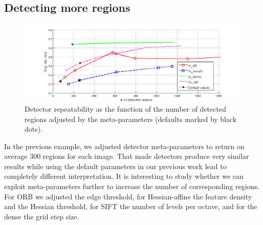 \documentclass[10pt,journal,cspaper,compsoc]{IEEEtran}
\begin{document}
\subsection{Detecting more regions\label{sec:more_regions}}
%
\begin{figure}[h]
  \begin{center}
    \includegraphics[trim=60 0 40 0, clip=true, width=0.99\linewidth]{resources/antti_results/DetectingMoreRegions/DetectorPlot.png}
    \caption{Detector repeatability as the function of the number of
      detected regions adjusted by the meta-parameters (defaults
      marked by black dots).\label{fig:more_regions}}
  \end{center}
\end{figure}
%
In the previous example, we adjusted detector meta-parameters to
return on average 300 regions for each image. That made detectors
produce very similar results while using the default parameters in
our previous work lead to completely different interpretation. 
It is interesting to study whether we can exploit meta-parameters
further to increase the number of corresponding regions.
For ORB we adjusted the edge threshold, for
Hessian-affine the feature density and the Hessian threshold,
for SIFT the number of levels per octave, and for the dense
the grid step size.
\end{document}
